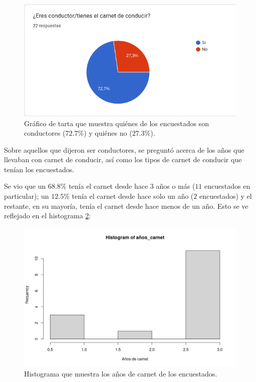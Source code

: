 \begin{figure}[H]
  \centering
  \includegraphics[width=\linewidth]{images/drivers-nodrivers.png}
  \caption{Gráfico de tarta que muestra quiénes de los encuestados son conductores ($72.7\%$) y quiénes no ($27.3\%$).}
  \label{fig:drivers-nodrivers}
\end{figure}

Sobre aquellos que dijeron ser conductores, se preguntó acerca de los años que
llevaban con carnet de conducir, así como los tipos de carnet de conducir que tenían
los encuestados.

Se vio que un $68.8\%$ tenía el carnet desde hace 3 años o más ($11$ encuestados
en particular); un $12.5\%$ tenía el carnet desde hace solo un año ($2$ encuestados)
y el restante, en su mayoría, tenía el carnet desde hace menos de un año. Esto se ve
reflejado en el histograma \ref{fig:carnet-time-hist}:

\begin{figure}[H]
  \centering
  \includegraphics[width=\linewidth]{images/carnet-time.png}
  \caption{Histograma que muestra los años de carnet de los encuestados.}
  \label{fig:carnet-time-hist}
\end{figure}

